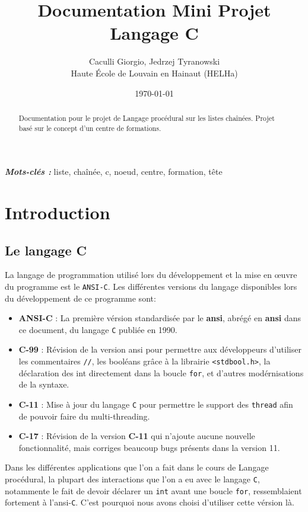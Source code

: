 \documentclass[10pt]{article}
\title{Documentation Mini Projet Langage C}
\author{Caculli Giorgio, Jedrzej Tyranowski\\Haute École de Louvain en Hainaut (HELHa)}
\date{\today}
\begin{document}
\maketitle
\begin{abstract}
  Documentation pour le projet de Langage procédural sur les listes chaînées. Projet basé sur le concept
  d'un centre de formations.
\end{abstract}
\textbf{\textit{Mots-clés : }}liste, chaînée, c, noeud, centre, formation, tête

\newpage
\tableofcontents

\newpage
\section{Introduction}

\subsection{Le langage C}
La langage de programmation utilisé lors du développement et la mise en \oe{}uvre du programme est le
\texttt{ANSI-C}. Les différentes versions du langage disponibles lors du développement de ce programme sont:
\begin{itemize}
\item \textbf{ANSI-C} : La première vérsion standardisée par le \textbf{\acrlong{ansi}},
  abrégé en \textbf{\acrshort{ansi}} dans ce document, du langage \texttt{C} publiée en 1990.
\item \textbf{C-99} : Révision de la version \acrshort{ansi} pour permettre aux développeurs d'utiliser les
  commentaires \texttt{//}, les booléans grâce à la librairie \texttt{<stdbool.h>}, la déclaration des int
  directement dans la boucle \texttt{for}, et d'autres modérnisations de la syntaxe.
\item \textbf{C-11} : Mise à jour du langage \texttt{C} pour permettre le support des \texttt{thread} afin de pouvoir faire du multi-threading.
\item \textbf{C-17} : Révision de la version \textbf{C-11} qui n'ajoute aucune nouvelle fonctionnalité, mais
  corriges beaucoup bugs présents dans la version 11.
\end{itemize}
Dans les différentes applications que l'on a fait dans le cours de Langage procédural, la plupart des
interactions que l'on a eu avec le langage \texttt{C}, notammente le fait de devoir déclarer un \texttt{int}
avant une boucle \texttt{for}, ressemblaient fortement à l'\acrshort{ansi}-\texttt{C}. C'est pourquoi nous
avons choisi d'utiliser cette vérsion là.
\end{document}
